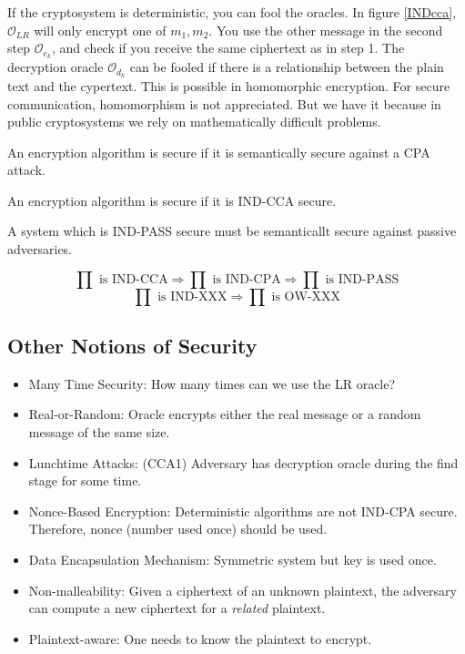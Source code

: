 If the cryptosystem is deterministic, you can fool the oracles. In figure \ref{INDcca}, $\mathcal{O}_{LR}$ will only encrypt one of $m_1, m_2$. You use the other message in the second step $\mathcal{O}_{e_k}$, and check if you receive the same ciphertext as in step 1.
The decryption oracle $\mathcal{O}_{d_k}$ can be fooled if there is a relationship between the plain text and the cypertext. This is possible in homomorphic encryption.
For secure communication, homomorphism is not appreciated. But we have it because in public cryptosystems we rely on mathematically difficult problems.
\begin{defn}
An encryption algorithm is secure if it is semantically secure against a CPA attack.
\end{defn}

\begin{defn}
An encryption algorithm is secure if it is IND-CCA secure.
\end{defn}

\begin{thm}
A system which is IND-PASS secure must be semanticallt secure against passive adversaries.

\[ \prod \text{ is IND-CCA} \Rightarrow \prod \text{ is IND-CPA} \Rightarrow \prod \text{ is IND-PASS} \] 
\[ \prod \text{ is IND-XXX} \Rightarrow \prod \text{ is OW-XXX} \]
\end{thm}

\subsection{Other Notions of Security}
\begin{itemize}
    \item Many Time Security: How many times can we use the LR oracle?
    \item Real-or-Random: Oracle encrypts either the real message or a random message of the same size.
    \item Lunchtime Attacks: (CCA1) Adversary has decryption oracle during the find stage for some time.
    \item Nonce-Based Encryption: Deterministic algorithms are not IND-CPA secure. Therefore, nonce (number used once) should be used.
    \item Data Encapsulation Mechanism: Symmetric system but key is used once.
    \item Non-malleability: Given a ciphertext of an unknown plaintext, the adversary can compute a new ciphertext for a \textit{related} plaintext.
    \item Plaintext-aware: One needs to know the plaintext to encrypt.
\end{itemize}

